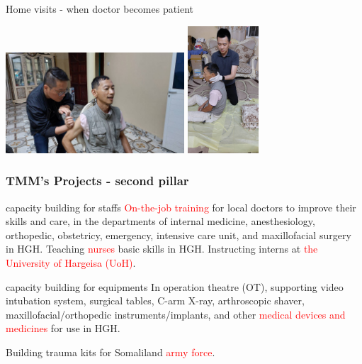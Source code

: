 \documentclass[aspectratio=169]{beamer}
\begin{document}
\begin{frame}{Home visits - when doctor becomes patient}
    \begin{center}
        \includegraphics[width=0.50\textwidth]{IMG-2343.JPG}
        \includegraphics[width=0.20\textwidth]{IMG-2338.JPG}
    \end{center}
\end{frame}

\begin{frame}
\frametitle{TMM's Projects - second pillar}
\begin{outline}    
    \1 capacity building for staffs
        \2 \textcolor{red}{On-the-job training} for local doctors to improve their skills and care, in the departments of internal medicine, anesthesiology, orthopedic, obstetricy, emergency, intensive care unit, and maxillofacial surgery in HGH.
        \2 Teaching \textcolor{red}{nurses} basic skills in HGH.        
        \2 Instructing interns at \textcolor{red}{the University of Hargeisa (UoH)}.
        
    \1 capacity building for equipments
        \2 In operation theatre (OT), supporting video intubation system, surgical tables, C-arm X-ray, arthroscopic shaver, maxillofacial/orthopedic instruments/implants, and other \textcolor{red}{medical devices and medicines} for use in HGH.

        \2 Building trauma kits for Somaliland \textcolor{red}{army force}.

\end{outline}
\end{frame}
\end{document}
